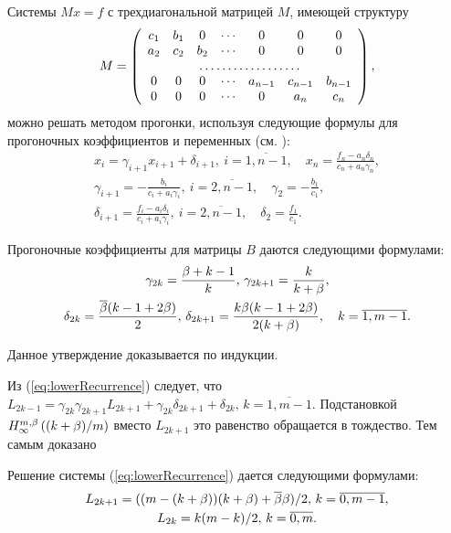 Системы $ Mx = f $ с трехдиагональной матрицей $ M $, имеющей структуру
\[
  M = \left(\begin{array}{ccccccc}
              c_1 & b_1 & 0   & \cdots & 0       & 0       & 0       \\
              a_2 & c_2 & b_2 & \cdots & 0       & 0       & 0       \\
              \hdotsfor{7}                                           \\
              0   & 0   & 0   & \cdots & a_{n-1} & c_{n-1} & b_{n-1} \\
              0 & 0 & 0 & \cdots & 0 & a_n & c_n
            \end{array}\right),
\]
можно решать методом прогонки, используя следующие формулы для
прогоночных коэффициентов и переменных (см. \cite{samarsky89}):
\begin{gather*}
  x_i = \gamma_{i+1} x_{i+1} + \delta_{i+1}, \: i = \overline{1,n-1},
  \quad
  x_n = \frac{f_n - a_n\delta_n}{c_n + a_n\gamma_n}, \\
  \gamma_{i+1} = -\frac{b_i}{c_i + a_i\gamma_i}, \: i = \overline{2,
    n-1}, \quad
  \gamma_2 = -\frac{b_1}{c_1}, \\
  \delta_{i+1} = \frac{f_i - a_i\delta_i}{c_i + a_i\gamma_i}, \: i =
  \overline{2, n-1}, \quad \delta_2 = \frac{f_1}{c_1}.
\end{gather*}

\begin{proposition}
  \label{proposition:tridiagonal:coefficients}
  Прогоночные коэффициенты для матрицы $B$ даются следующими
  формулами\textup{:}
  \begin{multline*}
    \gamma_{2k} = \frac{\beta+k-1}{k}, \,
    \gamma_{2k+1} = \frac{k}{k+\beta}, \\
    \delta_{2k} = \frac{\overline{\beta}(k-1+2\beta)}{2}, \, \delta_{2k+1} =
    \frac{k\beta(k-1+2\beta)}{2(k+\beta)}, \quad k = \overline{1,m-1}.
  \end{multline*}
\end{proposition}
Данное утверждение доказывается по индукции.

Из (\ref{eq:lowerRecurrence}) следует, что $L_{2k-1} =
\gamma_{2k}\gamma_{2k+1}L_{2k+1} + \gamma_{2k}\delta_{2k+1} +
\delta_{2k}, \, k = \overline{1, m-1}$. Подстановкой
$H_{\infty}^{m,\beta}\left({(k+\beta)/m}\right)$ вместо $L_{2k+1}$ это равенство обращается в
тождество. Тем самым доказано

\begin{proposition}
  \label{proposition:lower:recurrence-solution}
  Решение системы {\normalfont(\ref{eq:lowerRecurrence})} дается
  следующими формулами\textup{:}
  \begin{gather*}
    L_{2k+1} = ((m - (k + \beta))(k + \beta) + \overline{\beta}\beta)/2, \, k = \overline{0, m-1},\\
    L_{2k} = k (m-k)/2, \, k = \overline{0,m}.
  \end{gather*}
\end{proposition}

